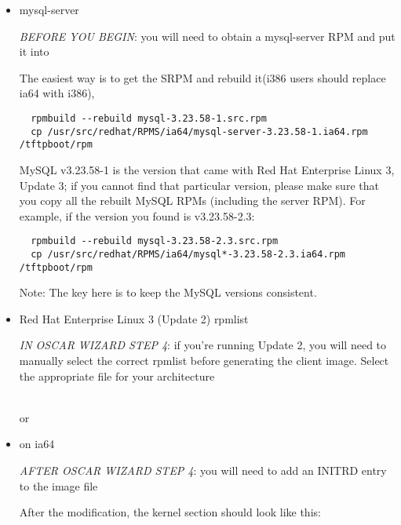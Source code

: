 \begin{itemize}

\item mysql-server

\emph{BEFORE YOU BEGIN}: you will need to obtain a mysql-server RPM and put it into


The easiest way is to get the SRPM and rebuild it\begchange (i386
users should replace ia64 with i386)\endchange,

\begin{verbatim}
  rpmbuild --rebuild mysql-3.23.58-1.src.rpm
  cp /usr/src/redhat/RPMS/ia64/mysql-server-3.23.58-1.ia64.rpm /tftpboot/rpm
\end{verbatim}

MySQL v3.23.58-1 is the version that came with Red Hat Enterprise Linux 3, Update 3; if you cannot
find that particular version, please make sure that you copy all the
rebuilt MySQL RPMs (including the server RPM).  For example, if the
version you found is v3.23.58-2.3:

\begin{verbatim}
  rpmbuild --rebuild mysql-3.23.58-2.3.src.rpm
  cp /usr/src/redhat/RPMS/ia64/mysql*-3.23.58-2.3.ia64.rpm /tftpboot/rpm
\end{verbatim}

Note: The key here is to keep the MySQL versions consistent.

\item Red Hat Enterprise Linux 3 (Update 2) rpmlist

\emph{IN OSCAR WIZARD STEP 4}: if you're running Update 2, you will
need to manually select the correct rpmlist before generating the client image.
Select the appropriate file for your architecture

  \ \\  %
or
  \ \\  %


\item {} on ia64

\emph{AFTER OSCAR WIZARD STEP 4}: you will need to add an INITRD entry to the image
file


After the modification, the kernel section should look like this:


\end{itemize}
